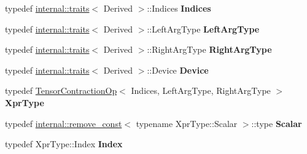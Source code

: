 \begin{DoxyCompactItemize}
\item 
\mbox{\label{struct_eigen_1_1_tensor_contraction_evaluator_base_afa6dea5d4bc12f61667ed05baecaa239}} 
typedef \hyperlink{struct_eigen_1_1internal_1_1traits}{internal\+::traits}$<$ Derived $>$\+::Indices {\bfseries Indices}
\item 
\mbox{\label{struct_eigen_1_1_tensor_contraction_evaluator_base_a5421c8a5abf7038189c9ed50be1a8246}} 
typedef \hyperlink{struct_eigen_1_1internal_1_1traits}{internal\+::traits}$<$ Derived $>$\+::Left\+Arg\+Type {\bfseries Left\+Arg\+Type}
\item 
\mbox{\label{struct_eigen_1_1_tensor_contraction_evaluator_base_a8661d0cd4198c090a6f50da7d7457f6c}} 
typedef \hyperlink{struct_eigen_1_1internal_1_1traits}{internal\+::traits}$<$ Derived $>$\+::Right\+Arg\+Type {\bfseries Right\+Arg\+Type}
\item 
\mbox{\label{struct_eigen_1_1_tensor_contraction_evaluator_base_a4a9a927d07b41e09823316da0575cb42}} 
typedef \hyperlink{struct_eigen_1_1internal_1_1traits}{internal\+::traits}$<$ Derived $>$\+::Device {\bfseries Device}
\item 
\mbox{\label{struct_eigen_1_1_tensor_contraction_evaluator_base_aa5dd727964de1120361b1fc1cfd33ede}} 
typedef \hyperlink{class_eigen_1_1_tensor_contraction_op}{Tensor\+Contraction\+Op}$<$ Indices, Left\+Arg\+Type, Right\+Arg\+Type $>$ {\bfseries Xpr\+Type}
\item 
\mbox{\label{struct_eigen_1_1_tensor_contraction_evaluator_base_a8284b1fb35e07c6e30f875b12653b44b}} 
typedef \hyperlink{struct_eigen_1_1internal_1_1remove__const}{internal\+::remove\+\_\+const}$<$ typename Xpr\+Type\+::\+Scalar $>$\+::type {\bfseries Scalar}
\item 
\mbox{\label{struct_eigen_1_1_tensor_contraction_evaluator_base_a79df006e2a7b5edd3e71382016865362}} 
typedef Xpr\+Type\+::\+Index {\bfseries Index}
\item 

\end{DoxyCompactItemize}
